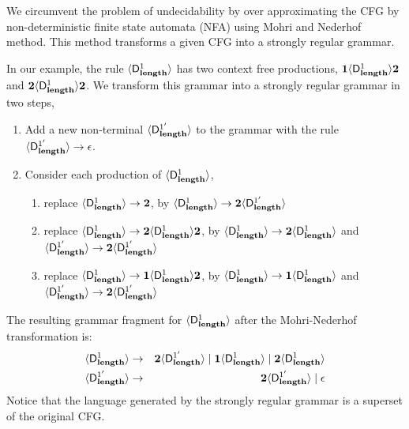 We circumvent the problem of  undecidability by over approximating the
CFG by non-deterministic finite state automata (NFA) using
Mohri   and   Nederhof~\cite{mohri00regular}   method.   This   method
transforms a  given CFG  into a strongly  regular grammar. 

In our example, the rule  $\var{\Df{\length}{1}}$ has two context free
productions,           $\acdr\var{\Df{\length}{1}}\clazy$          and
$\clazy\var{\Df{\length}{1}}{\clazy}$.  We transform this grammar into
a strongly regular grammar in two steps,

\begin{enumerate}
\item
Add a  new non-terminal  $\var{\Df{\length}{1'}}$ to the  grammar with
the rule $\var{\Df{\length}{1'}} \rightarrow \epsilon$.
\item
Consider each production of $\var{\Df{\length}{1}}$,
\begin{enumerate}
\item
 replace     $\var{\Df{\length}{1}}     \rightarrow     \clazy$,     by
 $\var{\Df{\length}{1}} \rightarrow \clazy\var{\Df{\length}{1'}}$
\item
 replace
 $\var{\Df{\length}{1}} \rightarrow \clazy\var{\Df{\length}{1}}\clazy$,
 by  $\var{\Df{\length}{1}}  \rightarrow  \clazy\var{\Df{\length}{1}}$
 and $\var{\Df{\length}{1'}} \rightarrow \clazy\var{\Df{\length}{1'}}$
\item
 replace
 $\var{\Df{\length}{1}} \rightarrow \acdr\var{\Df{\length}{1}}\clazy$,
 by $\var{\Df{\length}{1}} \rightarrow \acdr\var{\Df{\length}{1}}$ and
 $\var{\Df{\length}{1'}} \rightarrow \clazy\var{\Df{\length}{1'}}$
\end{enumerate}
\end{enumerate}


The    resulting    grammar    fragment    for    %
$\var{\Df{\length}{1}}$   after   the  Mohri-Nederhof   transformation
is:               \begin{eqnarray*}              \var{\Df{\length}{1}}
&\rightarrow& \clazy\var{\Df{\length}{1'}} \mid \acdr\var{\Df{\length}{1}} \mid \clazy\var{\Df{\length}{1}}\\ \var{\Df{\length}{1'}}
&\rightarrow& \clazy\var{\Df{\length}{1'}} \mid \epsilon \end{eqnarray*}
Notice that the language generated  by the strongly regular grammar is
a superset of the original CFG.


